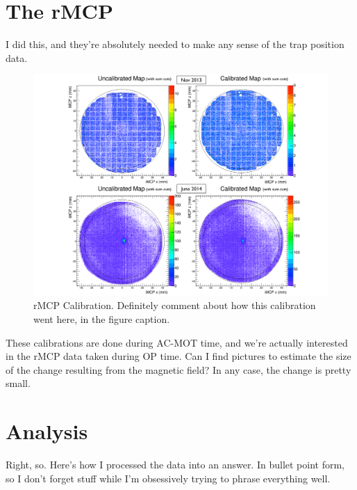 \section{The rMCP}
	I did this, and they're absolutely needed to make any sense of the trap position data.  
\begin{figure}[h!!t]
	\centering
	\includegraphics[width=.999\linewidth]
	{Figures/rMCP_Calibration}
	\caption[rMCP Calibration]{rMCP Calibration.  Definitely comment about how this calibration went here, in the figure caption. }	
	\label{fig:rmcp_calibration}
\end{figure}
	These calibrations are done during AC-MOT time, and we're actually interested in the rMCP data taken during OP time.  Can I find pictures to estimate the size of the change resulting from the magnetic field?  In any case, the change is pretty small.  



\section{Analysis}
\label{analysis_chapter}
Right, so.  Here's how I processed the data into an answer.  In bullet point form, so I don't forget stuff while I'm obsessively trying to phrase everything well.  
\newline

